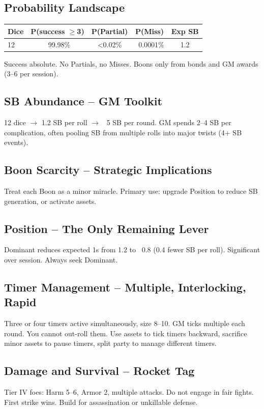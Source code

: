 \documentclass[11pt]{article}
\begin{document}
\subsection{Probability Landscape}
\begin{table}[h]
\centering
\begin{tabular}{lcccc}
\toprule
\textbf{Dice} & \textbf{P(success $\geq$3)} & \textbf{P(Partial)} & \textbf{P(Miss)} & \textbf{Exp SB} \\
\midrule
12 & ~99.98\% & <0.02\% & ~0.0001\% & 1.2 \\
\bottomrule
\end{tabular}
\end{table}
Success absolute. No Partials, no Misses. Boons only from bonds and GM awards (3--6 per session).

\subsection{SB Abundance -- GM Toolkit}
12 dice $\rightarrow$ 1.2 SB per roll $\rightarrow$ ~5 SB per round. GM spends 2--4 SB per complication, often pooling SB from multiple rolls into major twists (4+ SB events).

\subsection{Boon Scarcity -- Strategic Implications}
Treat each Boon as a minor miracle. Primary use: upgrade Position to reduce SB generation, or activate assets.

\subsection{Position -- The Only Remaining Lever}
Dominant reduces expected 1s from 1.2 to ~0.8 (0.4 fewer SB per roll). Significant over session. Always seek Dominant.

\subsection{Timer Management -- Multiple, Interlocking, Rapid}
Three or four timers active simultaneously, size 8--10. GM ticks multiple each round. You cannot out-roll them. Use assets to tick timers backward, sacrifice minor assets to pause timers, split party to manage different timers.

\subsection{Damage and Survival -- Rocket Tag}
Tier IV foes: Harm 5--6, Armor 2, multiple attacks. Do not engage in fair fights. First strike wins. Build for assassination or unkillable defense.
\end{document}
